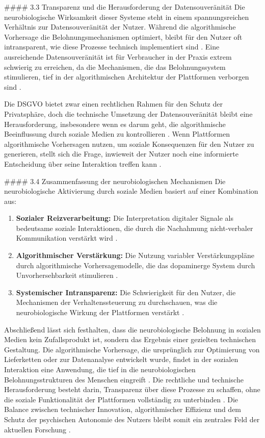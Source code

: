 \documentclass[11pt,a4paper]{article}
\begin{document}
\#\#\#\# 3.3 Transparenz und die Herausforderung der Datensouveränität Die neurobiologische Wirksamkeit dieser Systeme steht in einem spannungsreichen Verhältnis zur Datensouveränität der Nutzer. Während die algorithmische Vorhersage die Belohnungsmechanismen optimiert, bleibt für den Nutzer oft intransparent, wie diese Prozesse technisch implementiert sind \autocite{arxiv_2112_03879}. Eine ausreichende Datensouveränität ist für Verbraucher in der Praxis extrem schwierig zu erreichen, da die Mechanismen, die das Belohnungssystem stimulieren, tief in der algorithmischen Architektur der Plattformen verborgen sind \autocite{arxiv_2112_03879}.

Die DSGVO bietet zwar einen rechtlichen Rahmen für den Schutz der Privatsphäre, doch die technische Umsetzung der Datensouveränität bleibt eine Herausforderung, insbesondere wenn es darum geht, die algorithmische Beeinflussung durch soziale Medien zu kontrollieren \autocite{arxiv_2112_03879}. Wenn Plattformen algorithmische Vorhersagen nutzen, um soziale Konsequenzen für den Nutzer zu generieren, stellt sich die Frage, inwieweit der Nutzer noch eine informierte Entscheidung über seine Interaktion treffen kann \autocite{arxiv_2305_11981}.

\#\#\#\# 3.4 Zusammenfassung der neurobiologischen Mechanismen Die neurobiologische Aktivierung durch soziale Medien basiert auf einer Kombination aus:

\begin{enumerate}
  \item \textbf{Sozialer Reizverarbeitung:} Die Interpretation digitaler Signale als bedeutsame soziale Interaktionen, die durch die Nachahmung nicht-verbaler Kommunikation verstärkt wird \autocite{arxiv_2301_09025}.
  \item \textbf{Algorithmischer Verstärkung:} Die Nutzung variabler Verstärkungspläne durch algorithmische Vorhersagemodelle, die das dopaminerge System durch Unvorhersehbarkeit stimulieren \autocite{arxiv_2305_11981}.
  \item \textbf{Systemischer Intransparenz:} Die Schwierigkeit für den Nutzer, die Mechanismen der Verhaltenssteuerung zu durchschauen, was die neurobiologische Wirkung der Plattformen verstärkt \autocite{arxiv_2112_03879}.
\end{enumerate}

Abschließend lässt sich festhalten, dass die neurobiologische Belohnung in sozialen Medien kein Zufallsprodukt ist, sondern das Ergebnis einer gezielten technischen Gestaltung. Die algorithmische Vorhersage, die ursprünglich zur Optimierung von Lieferketten oder zur Datenanalyse entwickelt wurde, findet in der sozialen Interaktion eine Anwendung, die tief in die neurobiologischen Belohnungsstrukturen des Menschen eingreift \autocite{arxiv_2305_11981}. Die rechtliche und technische Herausforderung besteht darin, Transparenz über diese Prozesse zu schaffen, ohne die soziale Funktionalität der Plattformen vollständig zu unterbinden \autocite{arxiv_1705_08889}. Die Balance zwischen technischer Innovation, algorithmischer Effizienz und dem Schutz der psychischen Autonomie des Nutzers bleibt somit ein zentrales Feld der aktuellen Forschung \autocite{arxiv_2112_03879}.
\end{document}
